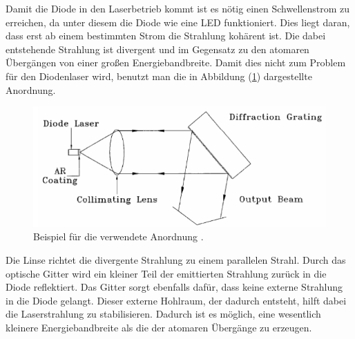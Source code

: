 Damit die Diode in den Laserbetrieb kommt ist es nötig einen Schwellenstrom zu erreichen, da unter diesem die Diode wie eine LED funktioniert. Dies liegt daran, dass erst ab einem bestimmten
Strom die Strahlung kohärent ist. Die dabei entstehende Strahlung ist divergent und im Gegensatz zu den atomaren Übergängen von einer großen Energiebandbreite. Damit dies nicht zum Problem
für den Diodenlaser wird, benutzt man die in Abbildung (\ref{fig:litt}) dargestellte Anordnung.
\begin{figure}[h!]
  \centering
  \includegraphics[scale=0.7]{fig/litt.png}
  \caption{Beispiel für die verwendete Anordnung \cite[5]{Anleitung}.}
  \label{fig:litt}
\end{figure}
\FloatBarrier
\noindent Die Linse richtet die divergente Strahlung zu einem parallelen Strahl. Durch das optische Gitter wird ein kleiner Teil der emittierten Strahlung zurück in die Diode reflektiert. Das Gitter sorgt ebenfalls dafür, dass keine externe Strahlung in die Diode gelangt. Dieser externe Hohlraum, der dadurch entsteht, hilft dabei die Laserstrahlung zu stabilisieren. Dadurch ist es möglich, eine wesentlich kleinere Energiebandbreite als die der atomaren Übergänge zu erzeugen.
